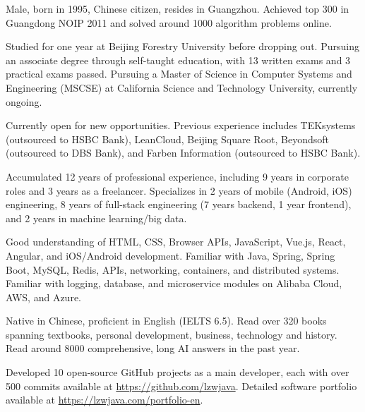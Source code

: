 

\begin{cventry}
    {} %
    {} %
    {} %
    {} %
    {
        \begin{cvitems}
            \item {Male, born in 1995, Chinese citizen, resides in Guangzhou. Achieved top 300 in Guangdong NOIP 2011 and solved around 1000 algorithm problems online.}
            \item {Studied for one year at Beijing Forestry University before dropping out. Pursuing an associate degree through self-taught education, with 13 written exams and 3 practical exams passed. Pursuing a Master of Science in Computer Systems and Engineering (MSCSE) at California Science and Technology University, currently ongoing.}
            \item {Currently open for new opportunities. Previous experience includes TEKsystems (outsourced to HSBC Bank), LeanCloud, Beijing Square Root, Beyondsoft (outsourced to DBS Bank), and Farben Information (outsourced to HSBC Bank).}
            \item {Accumulated 12 years of professional experience, including 9 years in corporate roles and 3 years as a freelancer. Specializes in 2 years of mobile (Android, iOS) engineering, 8 years of full-stack engineering (7 years backend, 1 year frontend), and 2 years in machine learning/big data.}
            \item {Good understanding of HTML, CSS, Browser APIs, JavaScript, Vue.js, React, Angular, and iOS/Android development. Familiar with Java, Spring, Spring Boot, MySQL, Redis, APIs, networking, containers, and distributed systems. Familiar with logging, database, and microservice modules on Alibaba Cloud, AWS, and Azure.}
            \item {Native in Chinese, proficient in English (IELTS 6.5). Read over 320 books spanning textbooks, personal development, business, technology and history. Read around 8000 comprehensive, long AI answers in the past year.}
            \item {Developed 10 open-source GitHub projects as a main developer, each with over 500 commits available at \href{https://github.com/lzwjava}{https://github.com/lzwjava}. Detailed software portfolio available at \href{https://lzwjava.com/portfolio-en}{https://lzwjava.com/portfolio-en}.}

\end{cvitems}}
\end{cventry}

